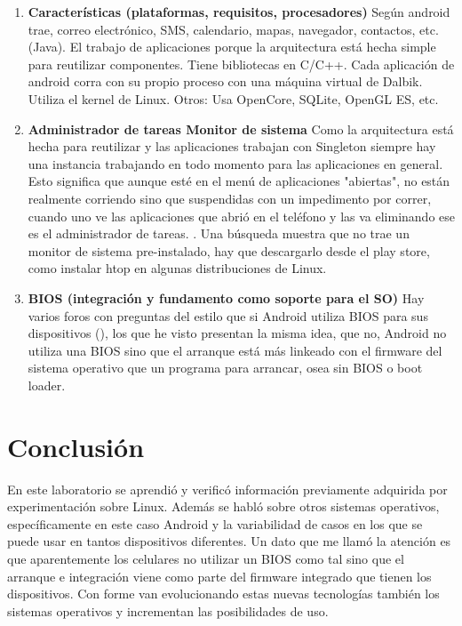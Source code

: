 \documentclass[stu, 12pt, letterpaper, donotrepeattitle, floatsintext, natbib, helv]{apa7}
\begin{document}
\begin{enumerate}
    \item \textbf{Características (plataformas, requisitos, procesadores)}
    Según \cite{andorid2} android trae, correo electrónico, SMS, calendario, mapas, navegador, contactos, etc. (Java). El trabajo de aplicaciones porque la arquitectura está hecha simple para reutilizar componentes. Tiene bibliotecas en C/C++. Cada aplicación de android corra con su propio proceso con una máquina virtual de Dalbik. Utiliza el kernel de Linux. Otros: Usa OpenCore, SQLite, OpenGL ES, etc.
    
    \item \textbf{Administrador de tareas Monitor de sistema}
    Como la arquitectura está hecha para reutilizar y las aplicaciones trabajan con Singleton siempre hay una instancia trabajando en todo momento para las aplicaciones en general. Esto significa que aunque esté en el menú de aplicaciones "abiertas", no están realmente corriendo sino que suspendidas con un impedimento por correr, cuando uno ve las aplicaciones que abrió en el teléfono y las va eliminando ese es el administrador de tareas. . Una búsqueda muestra que no trae un monitor de sistema pre-instalado, hay que descargarlo desde el play store, como instalar htop en algunas distribuciones de Linux.


    \item \textbf{BIOS (integración y fundamento como soporte para el SO)}
    Hay varios foros con preguntas del estilo que si Android utiliza BIOS para sus dispositivos (\cite{androidBIOS}), los que he visto presentan la misma idea, que no, Android no utiliza una BIOS sino que el arranque está más linkeado con el firmware del sistema operativo que un programa para arrancar, osea sin BIOS o boot loader.

\end{enumerate}

\section*{Conclusión}
{}
En este laboratorio se aprendió y verificó información previamente adquirida por experimentación sobre Linux. Además se habló sobre otros sistemas operativos, específicamente en este caso Android y la variabilidad de casos en los que se puede usar en tantos dispositivos diferentes. Un dato que me llamó la atención es que aparentemente los celulares no utilizar un BIOS como tal sino que el arranque e integración viene como parte del firmware integrado que tienen los dispositivos. Con forme van evolucionando estas nuevas tecnologías también los sistemas operativos y incrementan las posibilidades de uso.

\newpage
\renewcommand\refname{\large\textbf{Referencias}}

\end{document}
